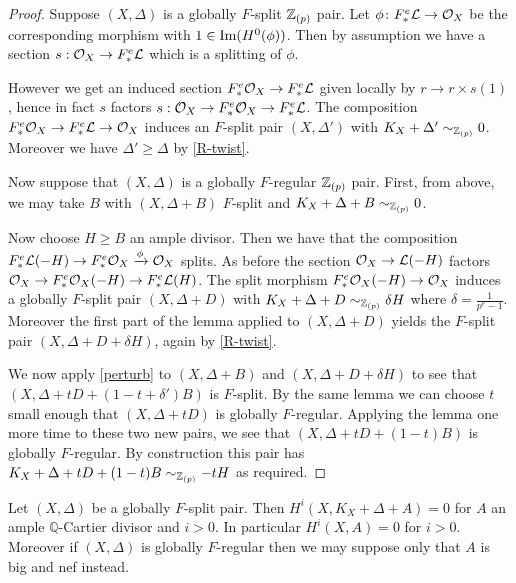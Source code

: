 \begin{proof}
	Suppose $(X,\Delta)$ is a globally $F$-split $\mathbb{Z}_{(p)}$ pair. Let $\phi\colon F_{*}^{e}\mathcal{L} \to \mathcal{O}_{X}$ be the corresponding morphism with $1 \in \textup{Im}(H^{0}(\phi))$. Then by assumption we have a section $s:\mathcal{O}_{X} \to F_{*}^{e}\mathcal{L}$ which is a splitting of $\phi$. 
	
	However we get an induced section $F_{*}^{e} \mathcal{O}_{X} \to F_{*}^{e}\mathcal{L}$ given locally by $r \to r\times s(1)$, hence in fact $s$ factors $s: \mathcal{O}_{X} \to F_{*}^{e}\mathcal{O}_{X} \to F_{*}^{e}\mathcal{L}$. The composition $F^{e}_{*} \mathcal{O}_{X} \to F^{e}_{*} \mathcal{L} \to \mathcal{O}_{X}$ induces an $F$-split pair $(X,\Delta')$ with $K_{X}+\Delta' \sim_{\mathbb{Z}_{(p)}} 0$. Moreover we have $\Delta' \geq \Delta$ by \autoref{R-twist}.
		
	Now suppose that $(X,\Delta)$ is a globally $F$-regular $\mathbb{Z}_{(p)}$ pair. First, from above, we may take $B$ with $(X,\Delta+B)$ $F$-split and $K_{X}+\Delta+B \sim_{\mathbb{Z}_{(p)}} 0$.
	
	Now choose $H\geq B$ an ample divisor. Then we have that the composition $F^{e}_{*} \mathcal{L}(-H) \to F^{e}_{*} \mathcal{O}_{X} \xrightarrow{\phi} \mathcal{O}_{X}$ splits. As before the section $\mathcal{O}_{X} \to \mathcal{L}(-H)$ factors $\mathcal{O}_{X} \to F^{e}_{*}\mathcal{O}_{X}(-H) \to F^{e}_{*} \mathcal{L}(H)$. The split morphism $F^{e}_{*}\mathcal{O}_{X}(-H) \to \mathcal{O}_{X}$ induces a globally $F$-split pair $(X,\Delta+D)$ with $K_{X}+\Delta+D \sim_{\mathbb{Z}_{(p)}} \delta H$ where $\delta=\frac{1}{p^{e}-1}$. Moreover the first part of the lemma applied to $(X,\Delta+D)$ yields the $F$-split pair $(X,\Delta+D+\delta H)$, again by \autoref{R-twist}.
	
	We now apply \autoref{perturb} to $(X,\Delta+B)$ and $(X,\Delta+D+\delta H)$ to see that $(X,\Delta+ tD + (1-t+\delta')B)$ is $F$-split. By the same lemma we can choose $t$ small enough that $(X,\Delta+tD)$ is globally $F$-regular. Applying the lemma one more time to these two new pairs, we see that $(X,\Delta+tD+(1-t)B)$ is globally $F$-regular. By construction this pair has $K_{X}+\Delta+tD+(1-t)B \sim_{\mathbb{Z}_{(p)}} -tH$ as required. 
		
\end{proof}

\begin{lemma}\label{vanish}
	
	Let $(X,\Delta)$ be a globally $F$-split pair. Then $H^{i}(X,K_{X}+\Delta+A)=0$ for $A$ an ample $\mathbb{Q}$-Cartier divisor and $i> 0$. In particular $H^{i}(X,A)=0$ for $i> 0$. Moreover if $(X,\Delta)$ is globally $F$-regular then we may suppose only that $A$ is big and nef instead.
	
	\end{lemma}

